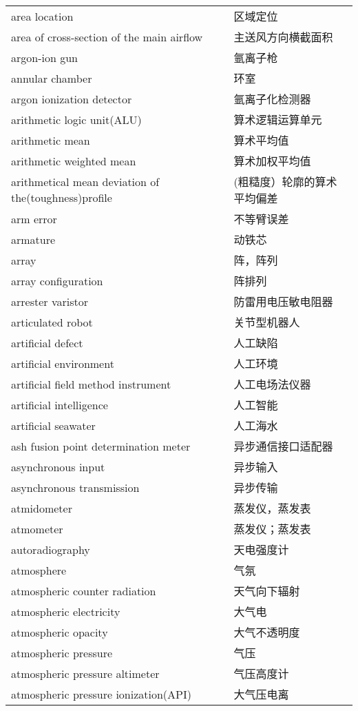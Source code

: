 \documentclass[
]{article}
\begin{document}
\begin{longtable}[]{@{}ll@{}}
area location & 区域定位 \\
area of cross-section of the main airflow & 主送风方向横截面积 \\
argon-ion gun & 氩离子枪 \\
annular chamber & 环室 \\
argon ionization detector & 氩离子化检测器 \\
arithmetic logic unit(ALU) & 算术逻辑运算单元 \\
arithmetic mean & 算术平均值 \\
arithmetic weighted mean & 算术加权平均值 \\
arithmetical mean deviation of the(toughness)profile &
(粗糙度）轮廓的算术平均偏差 \\
arm error & 不等臂误差 \\
armature & 动铁芯 \\
array & 阵，阵列 \\
array configuration & 阵排列 \\
arrester varistor & 防雷用电压敏电阻器 \\
articulated robot & 关节型机器人 \\
artificial defect & 人工缺陷 \\
artificial environment & 人工环境 \\
artificial field method instrument & 人工电场法仪器 \\
artificial intelligence & 人工智能 \\
artificial seawater & 人工海水 \\
ash fusion point determination meter & 异步通信接口适配器 \\
asynchronous input & 异步输入 \\
asynchronous transmission & 异步传输 \\
atmidometer & 蒸发仪，蒸发表 \\
atmometer & 蒸发仪；蒸发表 \\
autoradiography & 天电强度计 \\
atmosphere & 气氛 \\
atmospheric counter radiation & 天气向下辐射 \\
atmospheric electricity & 大气电 \\
atmospheric opacity & 大气不透明度 \\
atmospheric pressure & 气压 \\
atmospheric pressure altimeter & 气压高度计 \\
atmospheric pressure ionization(API) & 大气压电离 \\

\end{longtable}
\end{document}
